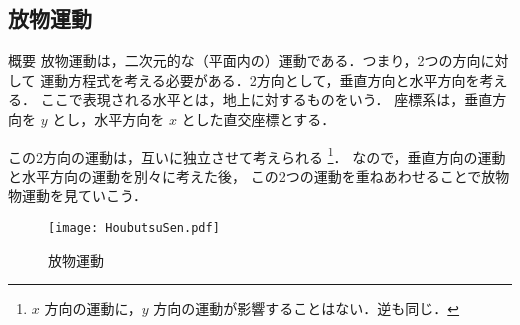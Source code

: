         \subsection{放物運動}
            \begin{mysmallsec}{概要}
            放物運動は，二次元的な（平面内の）運動である．つまり，2つの方向に対して
            運動方程式を考える必要がある．2方向として，垂直方向と水平方向を考える．
            ここで表現される水平とは，地上に対するものをいう．
            座標系は，垂直方向を $y$ とし，水平方向を $x$ とした直交座標とする．

            この2方向の運動は，互いに独立させて考えられる
                \footnote{
                    $x$ 方向の運動に，$y$ 方向の運動が影響することはない．逆も同じ．
                }．
            なので，垂直方向の運動と水平方向の運動を別々に考えた後，
            この2つの運動を重ねあわせることで放物物運動を見ていこう．
                \begin{figure}[hbt]
                    \begin{center}
                        \texttt{[image: HoubutsuSen.pdf]}
                        \caption{放物運動}
                        \label{fig:HoubutsuSen}
                    \end{center}
                \end{figure}
            \end{mysmallsec}

